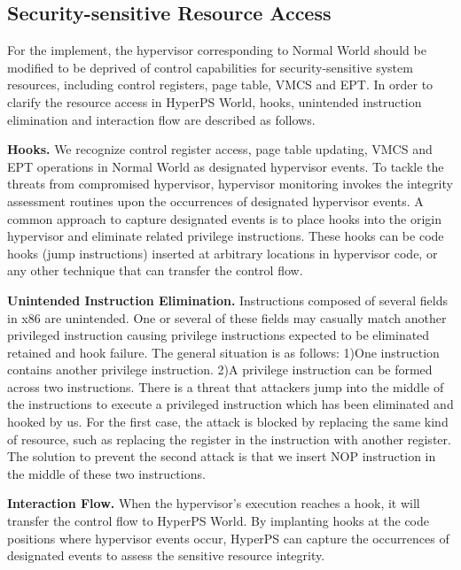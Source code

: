 ﻿\documentclass[conference]{IEEEtran}
\begin{document}
\subsection{Security-sensitive Resource Access}\label{IN}%


For the implement, the hypervisor corresponding to Normal World should be modified to be deprived of control capabilities for security-sensitive system resources, including control registers, page table, VMCS and EPT.
In order to clarify the resource access in HyperPS World, hooks, unintended instruction elimination and interaction flow are described as follows.

\textbf{Hooks.}
We recognize control register access, page table updating, VMCS and EPT operations in Normal World as designated hypervisor events.
To tackle the threats from compromised hypervisor, hypervisor monitoring invokes the integrity assessment routines upon the occurrences of designated hypervisor events. A common approach to capture designated events is to place hooks into the origin hypervisor and eliminate related privilege instructions. These hooks can be code hooks (jump instructions) inserted at arbitrary locations in hypervisor code, or any other technique that can transfer the control flow.


\textbf{Unintended Instruction Elimination.}
Instructions composed of several fields in x86 are unintended. One or several of these fields may casually match another privileged instruction causing privilege instructions expected to be eliminated retained and hook failure. The general situation is as follows: 1)One instruction contains another privilege instruction. 2)A privilege instruction can be formed across two instructions. There is a threat that attackers jump into the middle of the instructions to execute a privileged instruction which has been eliminated and hooked by us. 
For the first case, the attack is blocked by replacing the same kind of resource, such as replacing the register in the instruction with another register. The solution to prevent the second attack is that we insert NOP instruction in the middle of these two instructions.

\textbf{Interaction Flow.}
When the hypervisor's execution reaches a hook, it will transfer the control flow to HyperPS World. By implanting hooks at the code positions where hypervisor events occur, HyperPS can capture the occurrences of designated events to assess the sensitive resource integrity.
\end{document}
